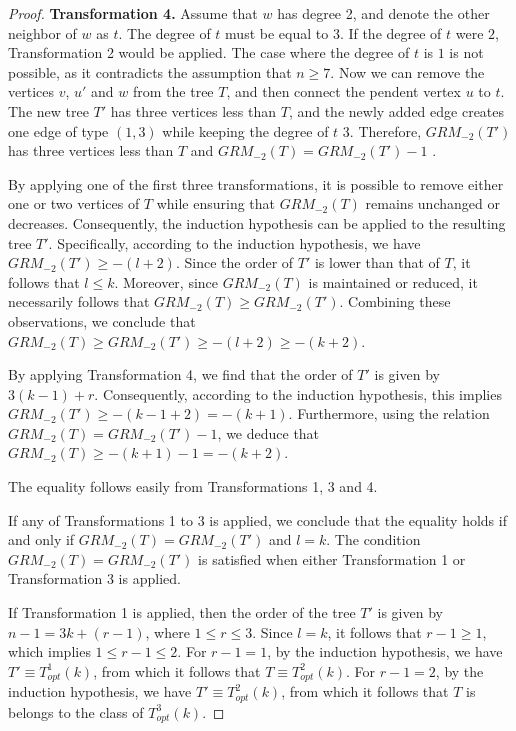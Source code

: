 \documentclass[preprint,12pt]{elsarticle}
\begin{document}
\begin{proof}
\medskip

{\bf Transformation 4.} Assume that $w$ has degree 2, and denote the other neighbor of $w$ as $t$. The degree of $t$ must be equal to $3$. If the degree of $t$ were $2$, Transformation 2 would be applied. The case where the degree of $t$ is $1$ is not possible, as it contradicts the assumption that $n \geq 7$. Now we can remove the vertices $v$, $u'$ and $w$ from the tree $T$, and then connect the pendent vertex $u$ to $t$. The new tree $T'$ has three vertices less than $T$, and the newly added edge creates one edge of type $(1, 3)$ while keeping the degree of $t$ 3. Therefore, $GRM_{-2}(T')$ has three vertices less than $T$ and $GRM_{-2}(T)=GRM_{-2}(T')-1$ . \medskip



By applying one of the first three transformations, it is possible to remove either one or two vertices of $T$ while ensuring that $GRM_{-2}(T)$ remains unchanged or decreases. Consequently, the induction hypothesis can be applied to the resulting tree $T'$. Specifically, according to the induction hypothesis, we have $GRM_{-2}(T')\geq -(l+2)$. Since the order of $T'$ is lower than that of $T$, it follows that $l\leq k$. Moreover, since $GRM_{-2}(T)$ is maintained or reduced, it necessarily follows that $GRM_{-2}(T)\geq GRM_{-2}(T')$. Combining these observations, we conclude that
$GRM_{-2}(T)\geq  GRM_{-2}(T')\geq -(l+2)\geq -(k+2)$.

By applying Transformation 4, we find that the order of $T'$ is given by $3(k-1)+r$. Consequently, according to the induction hypothesis, this implies $GRM_{-2}(T')\geq -(k-1+2)= -(k+1)$. Furthermore, using the relation $GRM_{-2}(T)=GRM_{-2}(T')-1$, we deduce that
$GRM_{-2}(T)\geq -(k+1)-1=-(k+2)$.


\medskip


The equality follows easily from Transformations 1, 3 and 4. 

If any of Transformations 1 to 3 is applied, we conclude that the equality holds if and only if $GRM_{-2}(T) = GRM_{-2}(T')$ and $l = k$.
The condition $GRM_{-2}(T) = GRM_{-2}(T')$ is satisfied when either Transformation 1 or Transformation 3 is applied.

If Transformation 1 is applied, then the order of the tree $T'$ is given by $n - 1 = 3k + (r - 1)$, where $1 \leq r \leq 3$. Since $l = k$, it follows that $r - 1 \geq 1$, which implies $1 \leq r - 1 \leq 2$.
For $r-1 = 1$, by the induction hypothesis, we have $T' \equiv T^1_{opt} (k)$, from which it follows that $T \equiv T^2_{opt} (k)$.
For $r-1 = 2$, by the induction hypothesis, we have $T' \equiv T^2_{opt} (k)$, from which it follows that $T$ is belongs to the class of $T^3_{opt} (k)$.


\end{proof}
\end{document}
